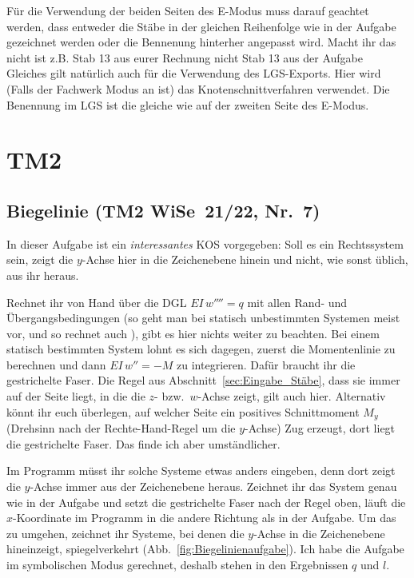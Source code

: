 Für die Verwendung der beiden Seiten des E-Modus muss darauf geachtet werden, dass entweder die Stäbe in der
gleichen Reihenfolge wie in der Aufgabe gezeichnet werden oder die Bennenung hinterher angepasst wird. Macht ihr das nicht
ist z.B. Stab 13 aus eurer Rechnung nicht Stab 13 aus der Aufgabe\\
Gleiches gilt natürlich auch für die Verwendung des LGS-Exports. Hier wird (Falls der Fachwerk Modus an ist)
das Knotenschnittverfahren verwendet. Die Benennung im LGS ist die gleiche wie auf der zweiten Seite des E-Modus.





\section{TM2}

\subsection{Biegelinie (TM2 WiSe~21/22, Nr.~7)} \label{ex:Biegelinienaufgabe}

In dieser Aufgabe ist ein \emph{interessantes} KOS vorgegeben: Soll es ein Rechtssystem sein,
zeigt die $y$-Achse hier in die Zeichenebene hinein und nicht, wie sonst üblich, aus ihr heraus.

Rechnet ihr von Hand über die DGL $EI\,w'''' = q$ mit allen Rand- und Übergangsbedingungen (so
geht man bei statisch unbestimmten Systemen meist vor, und so rechnet auch ), gibt es
hier nichts weiter zu beachten. Bei einem statisch bestimmten System lohnt es sich dagegen, zuerst
die Momentenlinie zu berechnen und dann $EI\,w'' = -M$ zu integrieren. Dafür braucht ihr die
gestrichelte Faser. Die Regel aus Abschnitt~\ref{sec:Eingabe_Stäbe}, dass sie immer auf der Seite
liegt, in die die $z$- bzw.\ $w$-Achse zeigt, gilt auch hier. Alternativ könnt ihr euch überlegen,
auf welcher Seite ein positives Schnittmoment $M_y$ (Drehsinn nach der Rechte-Hand-Regel um die
$y$-Achse) Zug erzeugt, dort liegt die gestrichelte Faser. Das finde ich aber umständlicher.

Im Programm müsst ihr solche Systeme etwas anders eingeben, denn dort zeigt die $y$-Achse immer
aus der Zeichenebene heraus. Zeichnet ihr das System genau wie in der Aufgabe und setzt die
gestrichelte Faser nach der Regel oben, läuft die $x$-Koordinate im Programm in die andere Richtung
als in der Aufgabe. Um das zu umgehen, zeichnet ihr Systeme, bei denen die $y$-Achse in die
Zeichenebene hineinzeigt, spiegelverkehrt (Abb.~\ref{fig:Biegelinienaufgabe}). Ich habe die
Aufgabe im symbolischen Modus gerechnet, deshalb stehen in den Ergebnissen $q$ und $l$.

